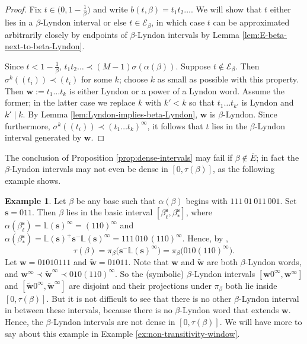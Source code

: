 \documentclass[11pt]{amsart}
\theoremstyle{definition}
\newtheorem{example}[theorem]{Example}
\theoremstyle{remark}
\numberwithin{equation}{section}
\renewcommand{\L}{\ensuremath{\mathbb{L}}}
\newcommand{\EE}{\mathscr{E}}
\newcommand{\s}{ {\mathbf{s}}}
\newcommand{\w}{\mathbf{w}}
\newcommand{\f}{\infty}
\newcommand{\al}{\alpha}
\newcommand{\si}{\sigma}
\begin{document}
\begin{proof}
Fix $t\in\big(0,1-\frac{1}{\beta}\big)$ and write $b(t,\beta)=t_1 t_2\dots$. We will show that $t$ either lies in a $\beta$-Lyndon interval or else $t\in{\EE_\beta}$, in which case $t$ can be approximated arbitrarily closely by endpoints of $\beta$-Lyndon intervals by Lemma \ref{lem:E-beta-next-to-beta-Lyndon}.

{Since $t<1-\frac{1}{\beta}$, $t_1t_2\ldots \prec (M-1)\si(\al(\beta))$.} Suppose $t\not\in{\EE_\beta}$. Then $\si^k((t_i))\prec (t_i)$ for some $k$; choose $k$ as small as possible with this property. Then $\w:=t_1\dots t_k$ is either Lyndon or a power of a Lyndon word. Assume the former; in the latter case we replace $k$ with $k'<k$ so that $t_1\dots t_{k'}$ is Lyndon and $k'\mid k$. By Lemma \ref{lem:Lyndon-implies-beta-Lyndon}, $\w$ is $\beta$-Lyndon. Since furthermore, $\si^k((t_i))\prec (t_1\dots t_k)^\f$, it follows that $t$ lies in the $\beta$-Lyndon interval generated by $\w$.
\end{proof}

The conclusion of Proposition \ref{prop:dense-intervals} may fail if $\beta\not\in\overline{E}$; in fact the $\beta$-Lyndon intervals may not even be dense in $[0,\tau(\beta)]$, as the following example shows. %

\begin{example} \label{ex:non-dense-intervals}
Let $\beta$ be any base such that $\alpha(\beta)$ begins with $111\, 01\, 011\,001$. Set $\s=011$. Then $\beta$ lies in the basic interval $[\beta_\ell^{\s},\beta_*^\s]$, where $\alpha(\beta_\ell^{\s})=\L(\s)^\f=(110)^\f$ and $\alpha(\beta_*^\s)=\L(\s)^+\s^-\L(\s)^\f=111\,010\,(110)^\f$. Hence, by \cite[Theorem 2]{Allaart-Kong-2021},
\[
\tau(\beta)=\pi_\beta\big(\s^-\L(\s)^\f\big)=\pi_\beta\big(010(110)^\f\big).
\]
Let $\w=01010111$ and $\tilde{\w}=01011$. Note that $\w$ and $\tilde{\w}$ are both $\beta$-Lyndon words, and $\w^\f\prec \tilde{\w}^\f\prec 010(110)^\f$. So the (symbolic) $\beta$-Lyndon intervals $[\w0^\f,\w^\f]$ and $[\tilde{\w}0^\f,\tilde{\w}^\f]$ are disjoint and their projections under $\pi_\beta$ both lie inside $[0,\tau(\beta)]$. But it is not difficult to see that there is no other $\beta$-Lyndon interval in between these intervals, because there is no $\beta$-Lyndon word that extends $\w$. Hence, the $\beta$-Lyndon intervals are not dense in $[0,\tau(\beta)]$. We will have more to say about this example in Example \ref{ex:non-transitivity-window}.
\end{example}
\end{document}

